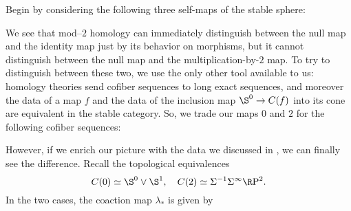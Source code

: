 Begin by considering the following three self-maps of the stable sphere:
\begin{center}
\end{center}
We see that mod--\(2\) homology can immediately distinguish between the null map and the identity map just by its behavior on morphisms, but it cannot distinguish between the null map and the multiplication-by-\(2\) map.  To try to distinguish between these two, we use the only other tool available to us: homology theories send cofiber sequences to long exact sequences, and moreover the data of a map \(f\) and the data of the inclusion map \(\S^0 \to C(f)\) into its cone are equivalent in the stable category.  So, we trade our maps \(0\) and \(2\) for the following cofiber sequences:
\begin{center}
\end{center}
However, if we enrich our picture with the data we discussed in , we can finally see the difference.  Recall the topological equivalences \[C(0) \simeq \S^0 \vee \S^1, \quad C(2) \simeq \Susp^{-1} \Susp^\infty \RP^2.\]  In the two cases, the coaction map \(\lambda_*\) is given by
